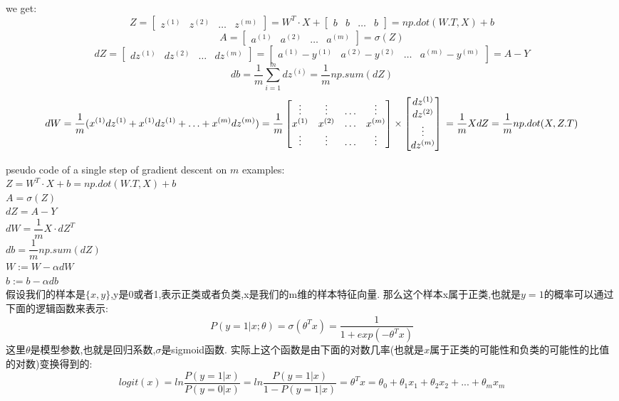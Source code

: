 we get:
$$Z = \begin{bmatrix}z^{(1)} & z^{(2)} & \ldots & z^{(m)}\end{bmatrix} = W^T \cdot X + \begin{bmatrix}b & b & \ldots & b\end{bmatrix} = np.dot(W.T, X) + b$$
$$A = \begin{bmatrix}a^{(1)} & a^{(2)} & \ldots & a^{(m)}\end{bmatrix} = \sigma(Z)$$
$$
dZ
= \begin{bmatrix}dz^{(1)} & dz^{(2)} & \ldots & dz^{(m)}\end{bmatrix}
= \begin{bmatrix}a^{(1)} - y^{(1)} & a^{(2)} - y^{(2)} & \ldots & a^{(m)} - y^{(m)}\end{bmatrix}
= A - Y
$$
$$db = \dfrac{1}{m} \sum_{i = 1}^m dz^{(i)} = \dfrac{1}{m} np.sum(dZ)$$
$$
dW
= \dfrac{1}{m} (x^{(1)} dz^{(1)} + x^{(1)} dz^{(1)} + \ldots + x^{(m)} dz^{(m)})
= \dfrac{1}{m}
  \begin{bmatrix}
	\vdots & \vdots & \ldots & \vdots \\
	x^{(1)} & x^{(2)} & \ldots & x^{(m)} \\
	\vdots & \vdots & \ldots & \vdots
  \end{bmatrix}
  \times
  \begin{bmatrix}
	  dz^{(1)} \\
	  dz^{(2)} \\
	  \vdots \\
	  dz^{(m)} \\
  \end{bmatrix} \\
= \dfrac{1}{m} X dZ \\
= \dfrac{1}{m} np.dot(X, Z.T)
$$

pseudo code of a single step of gradient descent on $m$ examples: \\
$Z = W^T \cdot X + b = np.dot(W.T, X) + b$ \\
$A = \sigma(Z)$ \\
$dZ = A - Y$ \\
$dW = \dfrac{1}{m} X \cdot dZ^T$ \\
$db = \dfrac{1}{m} np.sum(dZ)$ \\
$W := W - \alpha dW$ \\
$b := b - \alpha db$ \\

假设我们的样本是$\{x, y\}$,y是0或者1,表示正类或者负类,x是我们的m维的样本特征向量.
那么这个样本x属于正类,也就是$y = 1$的概率可以通过下面的逻辑函数来表示:
$$
P(y = 1| x; \theta) = \sigma(\theta^T x) = \frac{1}{1 + exp(- \theta^T x)}
$$
这里$\theta$是模型参数,也就是回归系数,$\sigma$是sigmoid函数.
实际上这个函数是由下面的对数几率(也就是$x$属于正类的可能性和负类的可能性的比值的对数)变换得到的:
$$
log it(x)
= ln \frac{P(y = 1 | x)}{P(y = 0 | x)}
= ln \frac{P(y = 1 | x)}{1 - P(y = 1 | x)}
= \theta^T x
= \theta_0 + \theta_1 x_1 + \theta_2 x_2 + ... + \theta_m x_m
$$

